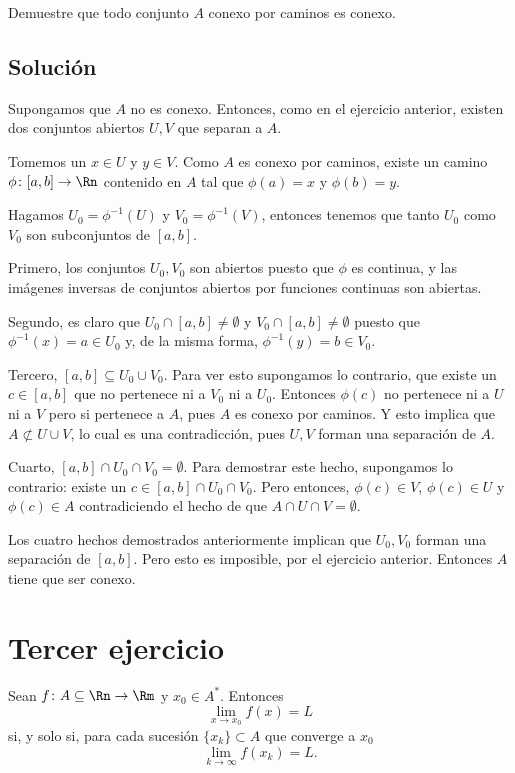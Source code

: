 \documentclass{scrartcl}
\begin{document}
Demuestre que todo conjunto \(A\) conexo por caminos es conexo.

\subsection{Solución}

Supongamos que \(A\) no es conexo.
Entonces, como en el ejercicio anterior,
existen dos conjuntos abiertos \(U,V\)
que separan a \(A\).

Tomemos un \(x \in U\) y \(y\in V\).
Como \(A\) es conexo por caminos, existe un camino
\(\phi \colon [a,b]\to \Rn\) contenido en \(A\) tal que
\(\phi(a) = x\) y \(\phi(b) = y\).

Hagamos \(U_0=\phi^{-1}(U)\) y \(V_0 = \phi^{-1}(V)\),
entonces tenemos que tanto \(U_0\) como \(V_0\) son
subconjuntos de \([a,b]\).

Primero, los conjuntos \(U_0, V_0\) son abiertos
puesto que \(\phi\) es continua, y las imágenes
inversas de conjuntos abiertos por funciones continuas
son abiertas.

Segundo, es claro que \(U_0\cap[a,b]\neq\emptyset\)
y \(V_0\cap[a,b]\neq\emptyset\) puesto que 
\(\phi^{-1}(x) = a \in U_0\) y, de la misma forma,
\(\phi^{-1}(y) = b \in V_0\).

Tercero, \([a,b] \subseteq U_0\cup V_0\).
Para ver esto supongamos lo contrario,
que existe un \(c\in [a,b]\) que no pertenece
ni a \(V_0\) ni a \(U_0\).
Entonces \(\phi(c)\) no pertenece ni a \(U\) ni
a \(V\) pero si pertenece a \(A\), pues \(A\)
es conexo por caminos. Y esto implica que
\(A\not\subset U\cup V\), lo cual es una contradicción,
pues \(U,V\) forman una separación de \(A\).

Cuarto, \([a,b]\cap U_0\cap V_0 = \emptyset\).
Para demostrar este hecho, supongamos lo contrario:
existe un \(c\in[a,b]\cap U_0\cap V_0\). Pero entonces,
\(\phi(c)\in V\), \(\phi(c)\in U\) y \(\phi(c)\in A\)
contradiciendo el hecho de que \(A\cap U\cap V = \emptyset\).

Los cuatro hechos demostrados anteriormente
implican que \(U_0,V_0\) forman una separación de
\([a,b]\). Pero esto es imposible, por el ejercicio anterior.
Entonces \(A\) tiene que ser conexo.

\section{Tercer ejercicio}

Sean \(f\colon A\subseteq\Rn\to\Rm\) y \(x_0\in A^*\).
Entonces
\[\lim_{x\to x_0}f(x) = L\]
si, y solo si, para cada sucesión \(\{x_k\}\subset A\)
que converge a \(x_0\)
\[\lim_{k\to\infty} f(x_k) = L.\]
\end{document}
